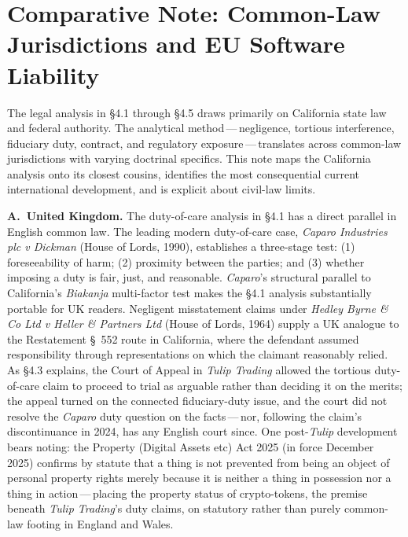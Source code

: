 \documentclass[11pt, twoside, openright]{book}
\newcommand{\reqitem}[2]{\medskip\noindent\textbf{#1\ #2}\quad\ignorespaces}
\newcommand{\sect}[1]{\S#1}
\begin{document}
\section{Comparative Note: Common-Law Jurisdictions and EU Software Liability}

The legal analysis in \sect{4.1} through \sect{4.5} draws primarily on California state law and federal authority. The analytical method\,---\,negligence, tortious interference, fiduciary duty, contract, and regulatory exposure\,---\,translates across common-law jurisdictions with varying doctrinal specifics. This note maps the California analysis onto its closest cousins, identifies the most consequential current international development, and is explicit about civil-law limits.

\reqitem{A.}{United Kingdom.} The duty-of-care analysis in \sect{4.1} has a direct parallel in English common law. The leading modern duty-of-care case, \textit{Caparo Industries plc v Dickman} (House of Lords, 1990), establishes a three-stage test: (1) foreseeability of harm; (2) proximity between the parties; and (3) whether imposing a duty is fair, just, and reasonable. \textit{Caparo}'s structural parallel to California's \textit{Biakanja} multi-factor test makes the \sect{4.1} analysis substantially portable for UK readers. Negligent misstatement claims under \textit{Hedley Byrne \& Co Ltd v Heller \& Partners Ltd} (House of Lords, 1964) supply a UK analogue to the Restatement \S~552 route in California, where the defendant assumed responsibility through representations on which the claimant reasonably relied. As \sect{4.3} explains, the Court of Appeal in \textit{Tulip Trading} allowed the tortious duty-of-care claim to proceed to trial as arguable rather than deciding it on the merits; the appeal turned on the connected fiduciary-duty issue, and the court did not resolve the \textit{Caparo} duty question on the facts\,---\,nor, following the claim's discontinuance in 2024, has any English court since. One post-\textit{Tulip} development bears noting: the Property (Digital Assets etc) Act 2025 (in force December 2025) confirms by statute that a thing is not prevented from being an object of personal property rights merely because it is neither a thing in possession nor a thing in action\,---\,placing the property status of crypto-tokens, the premise beneath \textit{Tulip Trading}'s duty claims, on statutory rather than purely common-law footing in England and Wales.
\end{document}
